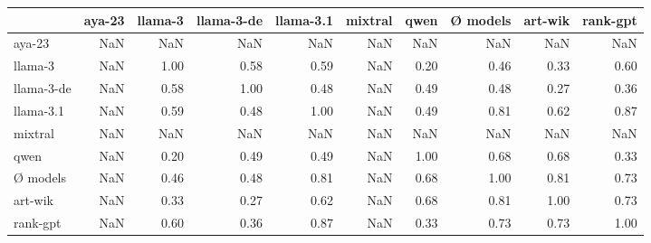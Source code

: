 \begin{tabular}{lrrrrrrrrr}
\toprule
 & aya-23 & llama-3 & llama-3-de & llama-3.1 & mixtral & qwen & Ø models & art-wik & rank-gpt \\
\midrule
aya-23 & NaN & NaN & NaN & NaN & NaN & NaN & NaN & NaN & NaN \\
llama-3 & NaN & 1.00 & 0.58 & 0.59 & NaN & 0.20 & 0.46 & 0.33 & 0.60 \\
llama-3-de & NaN & 0.58 & 1.00 & 0.48 & NaN & 0.49 & 0.48 & 0.27 & 0.36 \\
llama-3.1 & NaN & 0.59 & 0.48 & 1.00 & NaN & 0.49 & 0.81 & 0.62 & 0.87 \\
mixtral & NaN & NaN & NaN & NaN & NaN & NaN & NaN & NaN & NaN \\
qwen & NaN & 0.20 & 0.49 & 0.49 & NaN & 1.00 & 0.68 & 0.68 & 0.33 \\
Ø models & NaN & 0.46 & 0.48 & 0.81 & NaN & 0.68 & 1.00 & 0.81 & 0.73 \\
art-wik & NaN & 0.33 & 0.27 & 0.62 & NaN & 0.68 & 0.81 & 1.00 & 0.73 \\
rank-gpt & NaN & 0.60 & 0.36 & 0.87 & NaN & 0.33 & 0.73 & 0.73 & 1.00 \\
\bottomrule
\end{tabular}
